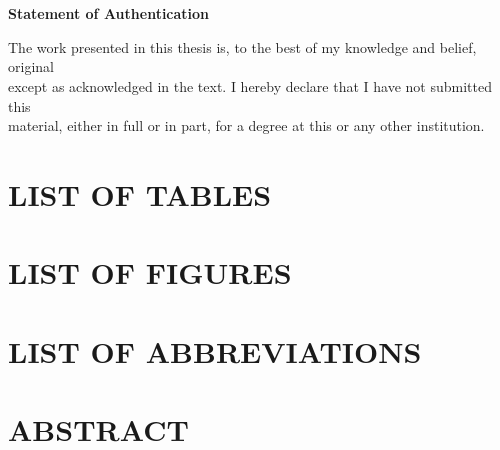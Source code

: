 \documentclass[a4paper]{article}
\begin{document}
\section*{}
\thispagestyle{empty}
    \begin{center}
      \vspace*{7cm}
        \LARGE
        \textbf{Statement of Authentication}
        \vspace{2.5cm}
        
        \normalsize
        The work presented in this thesis is, to the best of my knowledge and belief, original\\
        except as acknowledged in the text. I hereby declare that I have not submitted this\\
        material, either in full or in part, for a degree at this or any other institution.\\
        
    \end{center}
\clearpage

\tableofcontents

\setcounter{page}{4}
\clearpage
\section*{LIST OF TABLES}
   
\clearpage
\section*{LIST OF FIGURES}
  
\clearpage
\section*{LIST OF ABBREVIATIONS}
      
\clearpage
\section*{ABSTRACT}
\end{document}
